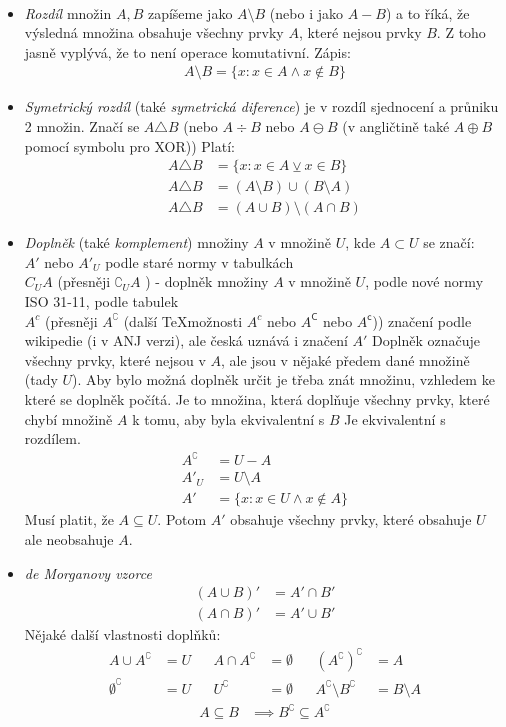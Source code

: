 \documentclass[12pt]{article}
\providecommand{\lxor}{\veebar}
\begin{document}
\begin{itemize}
\begin{align}
\end{align}
\item \emph{Rozdíl} množin $A,B$ zapíšeme jako $A \setminus B$ (nebo i jako $A -B$) a to říká, že výsledná množina obsahuje všechny prvky $A$, které nejsou prvky $B$. Z toho jasně vyplývá, že to není operace komutativní. Zápis:
\begin{align}
A \setminus B= \{ x: x \in A \land x \notin B \}
\end{align}
\item \emph{Symetrický rozdíl} (také \emph{symetrická diference}) je v rozdíl sjednocení a průniku 2 množin.  Značí se $A \triangle B$ (nebo $A \div B$ nebo $A \ominus B$ (v angličtině také $ A \oplus B$ pomocí symbolu pro XOR)) Platí:
\begin{align}
A \triangle B &= \{ x: x \in A \lxor x \in B \} \\
A \triangle B &= (A \setminus B) \cup (B \setminus A)\\
A \triangle B &= (A \cup B) \setminus (A \cap B)
\end{align}
\item \emph{Doplněk} (také \emph{komplement}) množiny $A$ v množině $U$, kde $A \subset U$ se značí:\\
$A'$ nebo $A'_{U}$ podle staré normy v tabulkách\\
$C_U A$ (přesněji $\complement_U A$ ) - doplněk množiny $A$ v množině $U$, podle nové normy ISO 31-11, podle tabulek\\
$A^c$  (přesněji $A^\complement$ (další \TeX možnosti $A^c$ nebo $A^\mathsf{C}$ nebo $A^\mathsf{c}$)) značení podle wikipedie (i v ANJ verzi), ale česká uznává i značení $A'$
Doplněk označuje všechny prvky, které nejsou v $A$, ale jsou v nějaké předem dané množině (tady $U$). Aby bylo možná doplněk určit je třeba znát množinu, vzhledem ke které se doplněk počítá. Je to množina, která doplňuje všechny prvky, které chybí množině $A$ k tomu, aby byla ekvivalentní s $B$ Je ekvivalentní s rozdílem.
\begin{align}
A^\complement &= U - A\\
A'_U &= U \setminus A \\
A' &= \{ x: x \in U \land x \notin A \}
\end{align}
Musí platit, že $A \subseteq U$. Potom $A'$ obsahuje všechny prvky, které obsahuje $U$ ale neobsahuje $A$. 
\item \emph{de Morganovy vzorce}
\begin{align}
(A \cup B)' &= A' \cap B' \\
(A \cap B)' &= A' \cup B'
\end{align}
Nějaké další vlastnosti doplňků:
\begin{align*}
A \cup A^\complement &= U && A \cap A^\complement &= \emptyset && (A^\complement)^\complement &= A  \\
\emptyset^\complement &= U && U^\complement &= \emptyset && A^\complement \setminus B^\complement &= B \setminus A
\end{align*}
\begin{align*}
A \subseteq B &\implies B^\complement \subseteq A^\complement
\end{align*}


\end{itemize}
\end{document}
